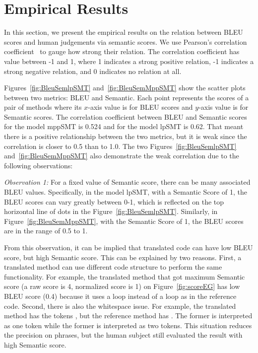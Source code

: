 \section{Empirical Results}
\label{sec:bleuresult}

In this section, we present the empirical results on the relation
between BLEU scores and human judgements via semantic scores.  We use
Pearson's correlation coefficient~\cite{PearsonCorrelation} to gauge
how strong their relation. The correlation coefficient has value
between -1 and 1, where 1 indicates a strong positive relation, -1
indicates a strong negative relation, and 0 indicates no relation at
all.

Figures~\ref{fig:BleuSemlpSMT} and~\ref{fig:BleuSemMppSMT} show the
scatter plots between two metrics: BLEU and Semantic. Each point
represents the scores of a pair of methods where its $x$-axis value is
for BLEU scores and $y$-axis value is for Semantic scores. The
correlation coefficient between BLEU and Semantic scores for the model
mppSMT is 0.524 and for the model lpSMT is 0.62. That meant there is a
positive relationship between the two metrics, but it is weak
since the correlation is closer to 0.5 than to 1.0. The two
Figures~\ref{fig:BleuSemlpSMT} and~\ref{fig:BleuSemMppSMT} also
demonstrate the weak correlation due to the following observations:

\emph{Observation 1:} For a fixed value of Semantic score, there can
be many associated BLEU values. Specifically, in the model lpSMT, with
a Semantic Score of 1, the BLEU scores can vary greatly between 0-1,
which is reflected on the top horizontal line of dots in the
Figure~\ref{fig:BleuSemlpSMT}. Similarly, in
Figure~\ref{fig:BleuSemMppSMT}, with the Semantic Score of 1, the BLEU
scores are in the range of 0.5 to 1.

From this observation, it can be implied that translated code can have
low BLEU score, but high Semantic score. This can be explained by two
reasons. First, a translated method can use different code structure
to perform the same functionality. For example, the translated method
that got maximum Semantic score (a raw score is 4, normalized score is
1) on Figure~\ref{fig:scoreEG} has low BLEU score (0.4) because it
uses a  loop instead of a  loop as in the
reference code. Second, there is also the whitespace issue. For
example, the translated method has the tokens , but the
reference method has . The former is interpreted as one
token while the former is interpreted as two tokens. This situation
reduces the precision on phrases, but the human subject still
evaluated the result with high Semantic score.

